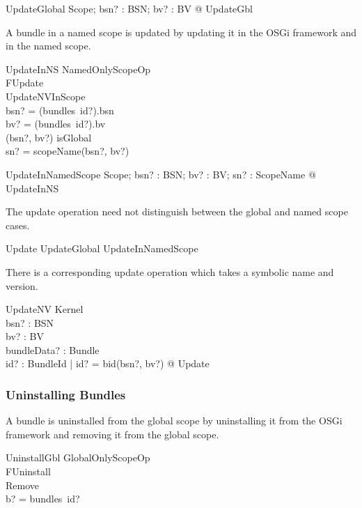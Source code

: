 \documentclass[a4paper,12pt]{article}
\begin{document}
\begin{zed}
UpdateGlobal  \exists \Delta Scope; bsn? : BSN; bv? : BV @ UpdateGbl \\
\end{zed}

A bundle in a named scope is updated by updating it in the OSGi framework and
in the named scope.
\begin{schema}{UpdateInNS}
NamedOnlyScopeOp \\
FUpdate \\
UpdateNVInScope \\
\where
bsn? = (bundles~id?).bsn \\
bv? =  (bundles~id?).bv \\
(bsn?, bv?) \notin isGlobal \\
sn? = scopeName(bsn?, bv?) \\
\end{schema}

\begin{zed}
UpdateInNamedScope  \exists \Delta Scope; bsn? : BSN; bv? : BV; sn? : ScopeName @ UpdateInNS \\
\end{zed}

The update operation need not distinguish between the global and named scope cases.
\begin{zed}
Update  UpdateGlobal \lor UpdateInNamedScope \\
\end{zed}

There is a corresponding update operation which takes a symbolic name and version.
\begin{schema}{UpdateNV}
\Delta Kernel \\
bsn? : BSN \\
bv? : BV \\
bundleData? : Bundle \\
\where
\exists id? : BundleId | id? = bid(bsn?, bv?) @ Update \\
\end{schema}

\subsubsection{Uninstalling Bundles}
A bundle is uninstalled from the global scope by uninstalling it from the OSGi framework and
removing it from the global scope.

\begin{schema}{UninstallGbl}
GlobalOnlyScopeOp \\
FUninstall \\
Remove \\
\where
b? = bundles~id? \\
\end{schema}
\end{document}
